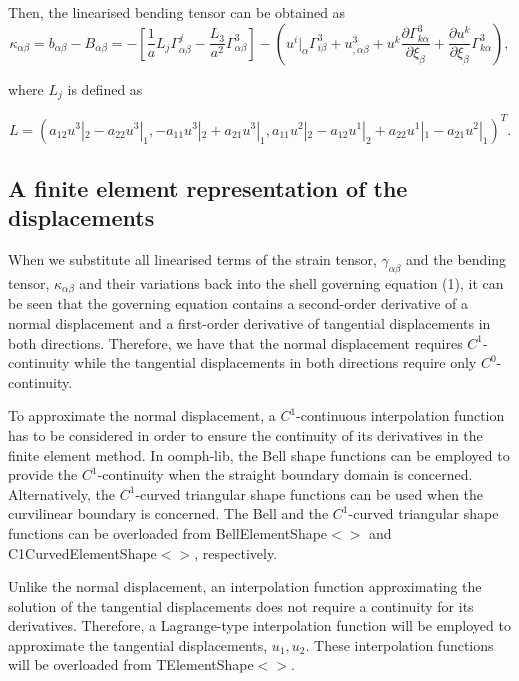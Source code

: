 Then, the linearised bending tensor can be obtained as \[ \kappa_{\alpha\beta} = b_{\alpha\beta} - B_{\alpha\beta} = - \left[ \frac{1}{a}L_{j}\Gamma^{j}_{\alpha\beta}-\frac{L_{3}}{a^2}\Gamma^{3}_{\alpha\beta}\right] - \left( u^{i}|_{\alpha}\Gamma^{3}_{i\beta} + u^{3}_{,\alpha\beta} + u^{k}\frac{\partial \Gamma^{3}_{k\alpha}}{\partial\xi_{\beta}} + \frac{\partial u^{k}}{\partial\xi_{\beta}}\Gamma^{3}_{k\alpha}\right), \]

where $ L_{j} $ is defined as

\[ L = \left( a_{12} u^{3}|_{2} - a_{22} u^{3}|_{1}, -a_{11} u^{3}|_{2} + a_{21} u^{3}|_{1}, a_{11} u^{2}|_{2} - a_{12} u^{1}|_{2} + a_{22} u^{1}|_{1} - a_{21} u^{2}|_{1} \right)^T. \]



\hypertarget{index_repr}{}\subsection{A finite element representation of the displacements}\label{index_repr}
When we substitute all linearised terms of the strain tensor, $ \gamma_{\alpha\beta} $ and the bending tensor, $ \kappa_{\alpha\beta} $ and their variations back into the shell governing equation (1), it can be seen that the governing equation contains a second-\/order derivative of a normal displacement and a first-\/order derivative of tangential displacements in both directions. Therefore, we have that the normal displacement requires $ C^1 $-\/continuity while the tangential displacements in both directions require only $ C^0 $-\/continuity.

To approximate the normal displacement, a $ C^1 $-\/continuous interpolation function has to be considered in order to ensure the continuity of its derivatives in the finite element method. In {\ttfamily oomph-\/lib}, the Bell shape functions can be employed to provide the $ C^1 $-\/continuity when the straight boundary domain is concerned. Alternatively, the $ C^1 $-\/curved triangular shape functions can be used when the curvilinear boundary is concerned. The Bell and the $ C^1 $-\/curved triangular shape functions can be overloaded from {\ttfamily Bell\+Element\+Shape$<$$>$} and {\ttfamily C1\+Curved\+Element\+Shape$<$$>$}, respectively.

Unlike the normal displacement, an interpolation function approximating the solution of the tangential displacements does not require a continuity for its derivatives. Therefore, a Lagrange-\/type interpolation function will be employed to approximate the tangential displacements, $ u_1, u_2. $ These interpolation functions will be overloaded from {\ttfamily T\+Element\+Shape$<$$>$}.

